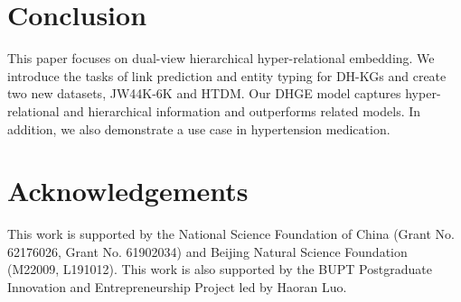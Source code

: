 \documentclass[letterpaper]{article} \usepackage{aaai23}  \usepackage{times}  \usepackage{helvet}  \usepackage{courier}  \usepackage[hyphens]{url}  \usepackage{graphicx} \urlstyle{rm} \def\UrlFont{\rm}  \usepackage{natbib}  \usepackage{caption} \frenchspacing  \setlength{\pdfpagewidth}{8.5in}  \setlength{\pdfpageheight}{11in}  \usepackage{times}
\begin{document}
\section{Conclusion}
\label{s7}
This paper focuses on dual-view hierarchical hyper-relational embedding. We introduce the tasks of link prediction and entity typing for DH-KGs and create two new datasets, JW44K-6K and HTDM. Our DHGE model captures hyper-relational and hierarchical information and outperforms related models. In addition, we also demonstrate a use case in hypertension medication.

\section*{Acknowledgements}
This work is supported by the National Science Foundation of China (Grant No. 62176026, Grant No. 61902034) and Beijing Natural Science Foundation (M22009, L191012). This work is also supported by the BUPT Postgraduate Innovation and Entrepreneurship Project led by Haoran Luo.



\end{document}
